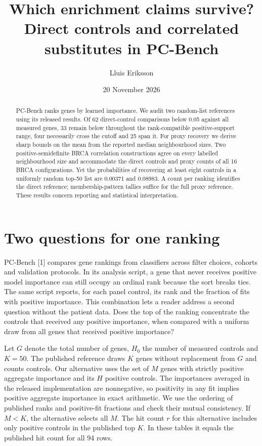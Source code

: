 \documentclass[11pt]{article}
\title{Which enrichment claims survive? Direct controls and correlated substitutes in PC-Bench}
\author{Lluis Eriksson}\date{20 November 2026}
\begin{document}
\maketitle
\begin{abstract}
PC-Bench ranks genes by learned importance. We audit two random-list references using its released results. Of 62 direct-control comparisons below 0.05 against all measured genes, 33 remain below throughout the rank-compatible positive-support range, four necessarily cross the cutoff and 25 span it. For proxy recovery we derive sharp bounds on the mean from the reported median neighbourhood sizes. Two positive-semidefinite BRCA correlation constructions agree on every labelled neighbourhood size and accommodate the direct controls and proxy counts of all 16 BRCA configurations. Yet the probabilities of recovering at least eight controls in a uniformly random top-50 list are 0.00371 and 0.08983. A count per ranking identifies the direct reference; membership-pattern tallies suffice for the full proxy reference. These results concern reporting and statistical interpretation.
\end{abstract}

\section{Two questions for one ranking}
PC-Bench [1] compares gene rankings from classifiers across filter choices, cohorts and validation protocols. In its analysis script, a gene that never receives positive model importance can still occupy an ordinal rank because the sort breaks ties. The same script reports, for each panel control, its rank and the fraction of fits with positive importance. This combination lets a reader address a second question without the patient data. Does the top of the ranking concentrate the controls that received any positive importance, when compared with a uniform draw from all genes that received positive importance?

Let $G$ denote the total number of genes, $H_0$ the number of measured controls and $K=50$. The published reference draws $K$ genes without replacement from $G$ and counts controls. Our alternative uses the set of $M$ genes with strictly positive aggregate importance and its $H$ positive controls. The importances averaged in the released implementation are nonnegative, so positivity in any fit implies positive aggregate importance in exact arithmetic. We use the ordering of published ranks and positive-fit fractions and check their mutual consistency. If $M<K$, the alternative selects all $M$. The hit count $r$ for this alternative includes only positive controls in the published top $K$. In these tables it equals the published hit count for all 94 rows.
\end{document}
